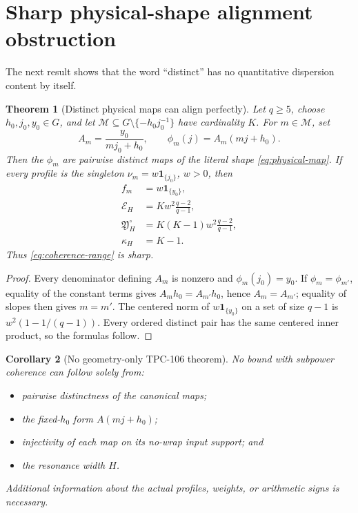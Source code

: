 \documentclass[11pt]{article}
\newtheorem{theorem}{Theorem}[section]
\newtheorem{corollary}[theorem]{Corollary}
\theoremstyle{remark}
\newcommand{\one}{\mathbf 1}
\newcommand{\YH}{\mathfrak Y_H^\circ}
\begin{document}
\section{Sharp physical-shape alignment obstruction}

The next result shows that the word ``distinct'' has no quantitative
dispersion content by itself.

\begin{theorem}[Distinct physical maps can align perfectly]
\label{thm:sharp-alignment}
Let \(q\ge5\), choose \(h_0,j_0,y_0\in G\), and let
\(\mathcal M\subseteq G\setminus\{-h_0j_0^{-1}\}\) have cardinality
\(K\).  For \(m\in\mathcal M\), set
\[
 A_m=\frac{y_0}{mj_0+h_0},
\qquad
 \phi_m(j)=A_m(mj+h_0).
\]
Then the \(\phi_m\) are pairwise distinct maps of the literal shape
\eqref{eq:physical-map}.  If every profile is the singleton
\(\nu_m=w\one_{\{j_0\}}\), \(w>0\), then
\begin{align}
 f_m&=w\one_{\{y_0\}},\\
 \mathcal E_H
 &=K w^2\frac{q-2}{q-1},\\
 \YH
 &=K(K-1)w^2\frac{q-2}{q-1},\\
 \kappa_H&=K-1.
\end{align}
Thus \eqref{eq:coherence-range} is sharp.
\end{theorem}

\begin{proof}
Every denominator defining \(A_m\) is nonzero and
\(\phi_m(j_0)=y_0\).  If \(\phi_m=\phi_{m'}\), equality of the
constant terms gives \(A_mh_0=A_{m'}h_0\), hence \(A_m=A_{m'}\);
equality of slopes then gives \(m=m'\).  The centered norm of
\(w\one_{\{y_0\}}\) on a set of size \(q-1\) is
\(w^2(1-1/(q-1))\).  Every ordered distinct pair has the same
centered inner product, so the formulas follow.
\end{proof}

\begin{corollary}[No geometry-only TPC-106 theorem]
\label{cor:no-geometry-only}
No bound with subpower coherence can follow solely from:
\begin{itemize}[leftmargin=2em]
\item pairwise distinctness of the canonical maps;
\item the fixed-\(h_0\) form \(A(mj+h_0)\);
\item injectivity of each map on its no-wrap input support; and
\item the resonance width \(H\).
\end{itemize}
Additional information about the actual profiles, weights, or
arithmetic signs is necessary.
\end{corollary}
\end{document}
